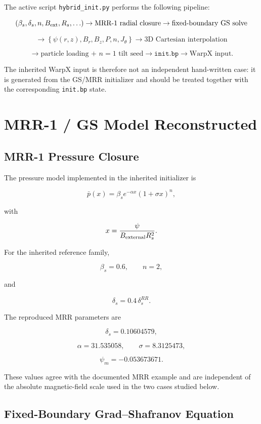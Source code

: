 \documentclass[11pt,a4paper]{article}
\begin{document}
The active script \texttt{hybrid\_init.py} performs the following pipeline:

\[
(\beta_s,\delta_s,n,B_{\rm ext},R_s,\ldots)
\rightarrow
\text{MRR-1 radial closure}
\rightarrow
\text{fixed-boundary GS solve}
\]

\[
\rightarrow
\left\{
\psi(r,z), B_r, B_z, P, n, J_\theta
\right\}
\rightarrow
\text{3D Cartesian interpolation}
\]

\[
\rightarrow
\text{particle loading + } n=1 \text{ tilt seed}
\rightarrow
\texttt{init.bp}
\rightarrow
\text{WarpX input}.
\]

The inherited WarpX input is therefore not an independent hand-written case:
it is generated from the GS/MRR initializer and should be treated together
with the corresponding \texttt{init.bp} state.

\section{MRR-1 / GS Model Reconstructed}

\subsection{MRR-1 Pressure Closure}

The pressure model implemented in the inherited initializer is

\[
\bar p(x)
=
\beta_s e^{-\alpha x}(1+\sigma x)^n,
\]

with

\[
x =
\frac{\psi}{B_{\rm external}R_s^2}.
\]

For the inherited reference family,

\[
\beta_s = 0.6,
\qquad
n = 2,
\]

and

\[
\delta_s
=
0.4\,\delta_s^{RR}.
\]

The reproduced MRR parameters are

\[
\delta_s = 0.10604579,
\]

\[
\alpha = 31.535058,
\qquad
\sigma = 8.3125473,
\]

\[
\psi_m = -0.053673671.
\]

These values agree with the documented MRR example and are independent of the
absolute magnetic-field scale used in the two cases studied below.

\subsection{Fixed-Boundary Grad--Shafranov Equation}
\end{document}
